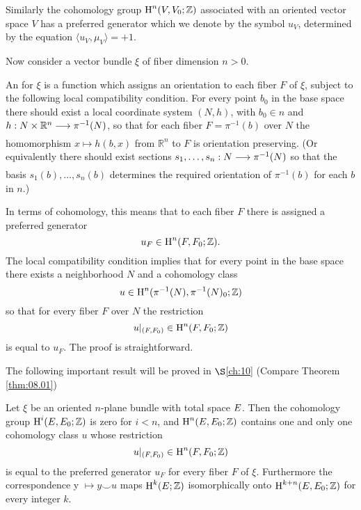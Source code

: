 \documentclass[../main]{subfiles}
\begin{document}
Similarly the cohomology group $\operatorname{H}^{n}(V, V_{0} ; \mathbb{Z})$ associated with an oriented vector space $V$ has a preferred generator which we denote by the symbol $u_{V}$, determined by the equation $\langle u_{V}, \mu_{V}\rangle=+1$.

Now consider a vector bundle $\xi$ of fiber dimension $n>0$.

\begin{definition} An  for $\xi$ is a function which assigns an orientation to each fiber $F$ of $\xi$, subject to the following local compatibility condition. For every point $b_{0}$ in the base space there should exist a local coordinate system $(N, h)$, with $b_{0} \in n$ and $h: N \times \mathbb{R}^{n} \varrightarrow{} \pi^{-1}(N)$, so that for each fiber $F=\pi^{-1} (b)$ over $N$ the homomorphism $x \mapsto h(b, x)$ from $\mathbb{R}^n$ to $F$ is orientation preserving. (Or equivalently there should exist sections $s_{1}, \ldots, s_{n}: N \varrightarrow{} \pi^{-1}(N)$ so that the basis $s_{1}(b), \ldots, s_{n}(b)$ determines the required orientation of $\pi^{-1}(b)$ for each $b$ in $n$.)

\end{definition}

In terms of cohomology, this means that to each fiber $F$ there is assigned a preferred generator
\[
u_{F} \in \operatorname{H}^{n}(F, F_{0} ; \mathbb{Z}) .
\]
The local compatibility condition implies that for every point in the base space there exists a neighborhood $N$ and a cohomology class
\[
u \in \operatorname{H}^{n}(\pi^{-1}(N), \pi^{-1}(N)_{0} ; \mathbb{Z})
\]
so that for every fiber $F$ over $N$ the restriction
\[
u|_{(F, F_{0})} \in \operatorname{H}^{n}(F, F_{0} ; \mathbb{Z})
\]
is equal to $u_{F}$. The proof is straightforward.

The following important result will be proved in $\S$\ref{ch:10} (Compare Theorem \ref{thm:08.01})

\begin{theorem}\label{thm:09.01} Let $\xi$ be an oriented $n$-plane bundle with total space $E$. Then the cohomology group $\operatorname{H}^{i}(E, E_{0} ; \mathbb{Z})$ is zero for $i<n$, and $\operatorname{H}^{n}(E, E_{0} ; \mathbb{Z})$ contains one and only one cohomology class $u$ whose restriction
\[
u |_{(F, F_{0})} \in \operatorname{H}^{n}(F, F_{0} ; \mathbb{Z})
\]
is equal to the preferred generator $u_{F}$ for every fiber $F$ of $\xi$. Furthermore the correspondence y $\mapsto y \smile u$ maps $\operatorname{H}^{k}(E ; \mathbb{Z})$ isomorphically onto $\operatorname{H}^{k+n}(E, E_{0} ; \mathbb{Z})$ for every integer $k$.

\end{theorem}
\end{document}
